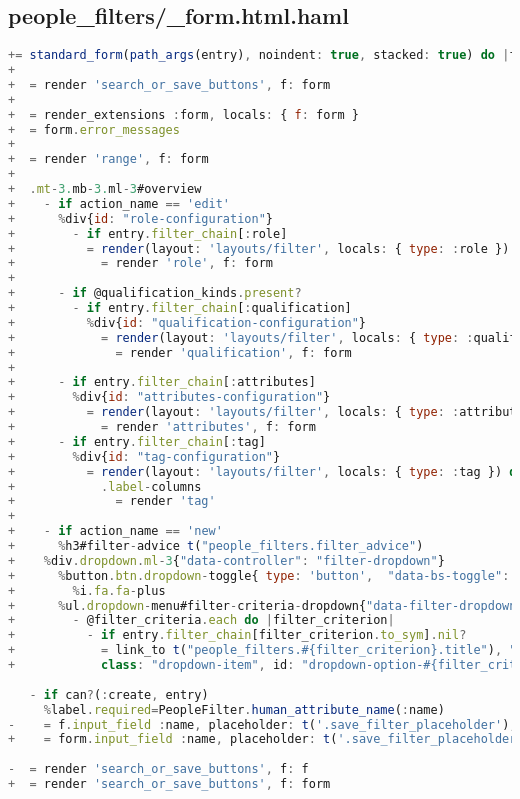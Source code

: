 \subsection{people\_filters/\_form.html.haml}
\begin{lstlisting}[language=JavaScript]
+= standard_form(path_args(entry), noindent: true, stacked: true) do |form|
+
+  = render 'search_or_save_buttons', f: form
+
+  = render_extensions :form, locals: { f: form }
+  = form.error_messages
+
+  = render 'range', f: form
+
+  .mt-3.mb-3.ml-3#overview
+    - if action_name == 'edit'
+      %div{id: "role-configuration"}
+        - if entry.filter_chain[:role]
+          = render(layout: 'layouts/filter', locals: { type: :role }) do
+            = render 'role', f: form
+
+      - if @qualification_kinds.present?
+        - if entry.filter_chain[:qualification]
+          %div{id: "qualification-configuration"}
+            = render(layout: 'layouts/filter', locals: { type: :qualification }) do
+              = render 'qualification', f: form
+
+      - if entry.filter_chain[:attributes]
+        %div{id: "attributes-configuration"}
+          = render(layout: 'layouts/filter', locals: { type: :attributes }) do
+            = render 'attributes', f: form
+      - if entry.filter_chain[:tag]
+        %div{id: "tag-configuration"}
+          = render(layout: 'layouts/filter', locals: { type: :tag }) do
+            .label-columns
+              = render 'tag'
+
+    - if action_name == 'new'
+      %h3#filter-advice t("people_filters.filter_advice")
+    %div.dropdown.ml-3{"data-controller": "filter-dropdown"}
+      %button.btn.dropdown-toggle{ type: 'button',  "data-bs-toggle": "dropdown", "aria-expanded": "false"}
+        %i.fa.fa-plus
+      %ul.dropdown-menu#filter-criteria-dropdown{"data-filter-dropdown-target": "menu"}
+        - @filter_criteria.each do |filter_criterion|
+          - if entry.filter_chain[filter_criterion.to_sym].nil?
+            = link_to t("people_filters.#{filter_criterion}.title"), "/groups/#{@group.id}/people_filters/#{filter_criterion}",
+            class: "dropdown-item", id: "dropdown-option-#{filter_criterion}", data: {turbo_stream: true}
 
   - if can?(:create, entry)
     %label.required=PeopleFilter.human_attribute_name(:name)
-    = f.input_field :name, placeholder: t('.save_filter_placeholder'), class: 'mb-3 ', required: false
+    = form.input_field :name, placeholder: t('.save_filter_placeholder'), class: 'mb-3 ', required: false
 
-  = render 'search_or_save_buttons', f: f
+  = render 'search_or_save_buttons', f: form   
\end{lstlisting}


